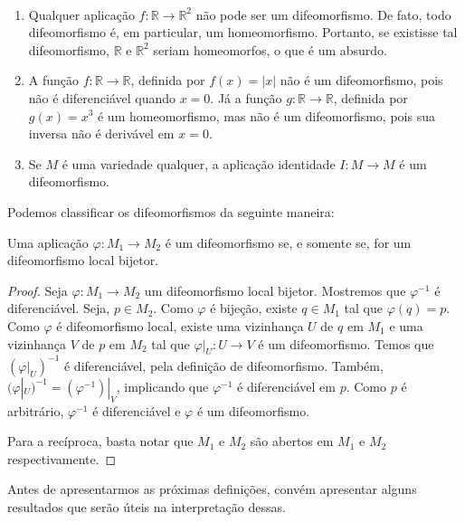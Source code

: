 	\begin{examples}
		\label{ex:difeomorfismos}
		$ $
		\begin{enumerate}
			\item Qualquer aplicação $f:\mathbb{R} \to \mathbb{R}^{2}$ não pode ser um difeomorfismo. De fato, todo difeomorfismo é, em particular, um homeomorfismo. Portanto, se existisse tal difeomorfismo, $\mathbb{R}$ e $\mathbb{R}^{2}$ seriam homeomorfos, o que é um absurdo.
			\item A função $f:\mathbb{R}\to \mathbb{R}$, definida por $f(x)=|x|$ não é um difeomorfismo, pois não é diferenciável quando $x=0$. Já a função $g:\mathbb{R}\to \mathbb{R}$, definida por $g(x)=x^{3}$ é um homeomorfismo, mas não é um difeomorfismo, pois sua inversa não é derivável em $x=0.$
			\item Se $M$ é uma variedade qualquer, a aplicação identidade $I:M\to M$ é um difeomorfismo.
		\end{enumerate}
	\end{examples}
	Podemos classificar os difeomorfismos da seguinte maneira:
	\begin{proposition}
		\label{prop:difeomorfismo-local-bijetor}
		Uma aplicação $\varphi:M_{1}\to M_{2}$ é um difeomorfismo se, e somente se, for um difeomorfismo local bijetor.
		\begin{proof}

			Seja $\varphi:M_{1}\to M_{2}$ um difeomorfismo local bijetor. Mostremos que $\varphi ^{-1}$ é diferenciável. Seja, $p \in M_{2}$. Como $\varphi$ é bijeção, existe $q \in M_{1}$ tal que $\varphi(q)=p$. Como $\varphi$ é difeomorfismo local, existe uma vizinhança $U$ de $q$ em $M_{1}$ e uma vizinhança $V$ de $p$ em $M_{2}$ tal que $\varphi|_{U}:U\to V$ é um difeomorfismo. Temos que $(\varphi|_{U})^{-1}$ é diferenciável, pela definição de difeomorfismo. Também, $(\varphi|_{U})^{-1}=(\varphi ^{-1})|_{V}$, implicando que $\varphi ^{-1}$ é diferenciável em $p$. Como $p$ é arbitrário, $\varphi ^{-1}$ é diferenciável e $\varphi$ é um difeomorfismo.

			Para a recíproca, basta notar que $M_{1}$ e $M_{2}$ são abertos em $M_{1}$ e $M_{2}$ respectivamente.
		\end{proof}
	\end{proposition}
	Antes de apresentarmos as próximas definições, convém apresentar alguns resultados que serão úteis na interpretação dessas.
